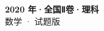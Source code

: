 \documentclass[zihao=-4, a4paper]{ctexart}
\begin{document}
\begin{center}
  {\Large\bfseries 2020 年·全国Ⅱ卷·理科}\\[4pt]
  {\large 数学 · 试题版}
\end{center}
\medskip
{}

\end{document}
